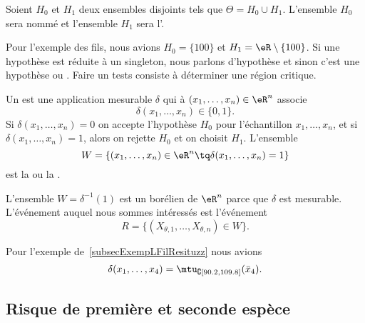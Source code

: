Soient \( H_0\) et \( H_1\) deux ensembles disjoints tels que \( \Theta=H_0\cup H_1\). L'ensemble \( H_0\) sera nommé  et l'ensemble \( H_1\) sera l'.

Pour l'exemple des fils, nous avions \( H_0=\{ 100 \}\) et \( H_1=\eR\setminus\{ 100 \}\). Si une hypothèse est réduite à un singleton, nous parlons d'hypothèse  et sinon c'est une hypothèse  ou . Faire un tests consiste à déterminer une région critique.

\begin{definition}
    Un  est une application mesurable \( \delta\) qui à \( (x_1,\ldots,x_n)\in\eR^n\) associe
    \begin{equation}
        \delta(x_1,\ldots,x_n)\in\{ 0,1 \}.
    \end{equation}
    Si \( \delta(x_1,\ldots,x_n)=0\) on accepte l'hypothèse \( H_0\) pour l'échantillon \( x_1,\ldots,x_n\), et si \( \delta(x_1,\ldots,x_n)=1\), alors on rejette \( H_0\) et on choisit \( H_1\). L'ensemble
    \begin{equation}
        W=\{ (x_1,\ldots,x_n)\in\eR^n\tq \delta(x_1,\ldots,x_n)=1 \}
    \end{equation}
    est la  ou la .
\end{definition}

L'ensemble \( W=\delta^{-1}(1)\) est un borélien de \( \eR^n\) parce que \( \delta\) est mesurable. L'événement auquel nous sommes intéressés est l'événement
\begin{equation}
    R=\{ (X_{\theta,1},\ldots,X_{\theta,n})\in W \}.
\end{equation}


\begin{example}
    Pour l'exemple de~\ref{subsecExempLFilResituzz} nous avions
    \begin{equation}
        \delta(x_1,\ldots,x_4)=\mtu_{\complement\mathopen[ 90.2 , 109.8 \mathclose]}(\bar x_4).
    \end{equation}
\end{example}

\subsection{Risque de première et seconde espèce}

